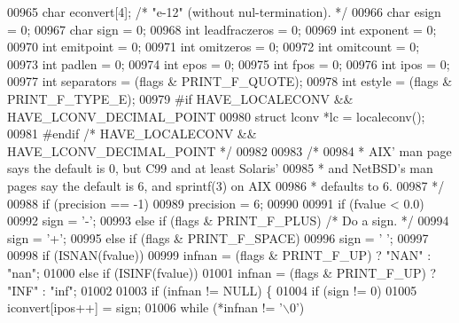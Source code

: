 \begin{DoxyCode}
{{{{{00965     \textcolor{keywordtype}{char} econvert[4];   \textcolor{comment}{/* "e-12" (without nul-termination). */}
00966     \textcolor{keywordtype}{char} esign = 0;
00967     \textcolor{keywordtype}{char} sign = 0;
00968     \textcolor{keywordtype}{int} leadfraczeros = 0;
00969     \textcolor{keywordtype}{int} exponent = 0;
00970     \textcolor{keywordtype}{int} emitpoint = 0;
00971     \textcolor{keywordtype}{int} omitzeros = 0;
00972     \textcolor{keywordtype}{int} omitcount = 0;
00973     \textcolor{keywordtype}{int} padlen = 0;
00974     \textcolor{keywordtype}{int} epos = 0;
00975     \textcolor{keywordtype}{int} fpos = 0;
00976     \textcolor{keywordtype}{int} ipos = 0;
00977     \textcolor{keywordtype}{int} separators = (flags & PRINT\_F\_QUOTE);
00978     \textcolor{keywordtype}{int} estyle = (flags & PRINT\_F\_TYPE\_E);
00979 \textcolor{preprocessor}{#if HAVE\_LOCALECONV && HAVE\_LCONV\_DECIMAL\_POINT}
00980     \textcolor{keyword}{struct }lconv *lc = localeconv();
00981 \textcolor{preprocessor}{#endif  }\textcolor{comment}{/* HAVE\_LOCALECONV && HAVE\_LCONV\_DECIMAL\_POINT */}\textcolor{preprocessor}{}
00982 
00983     \textcolor{comment}{/*}
00984 \textcolor{comment}{     * AIX' man page says the default is 0, but C99 and at least Solaris'}
00985 \textcolor{comment}{     * and NetBSD's man pages say the default is 6, and sprintf(3) on AIX}
00986 \textcolor{comment}{     * defaults to 6.}
00987 \textcolor{comment}{     */}
00988     \textcolor{keywordflow}{if} (precision == -1)
00989         precision = 6;
00990 
00991     \textcolor{keywordflow}{if} (fvalue < 0.0)
00992         sign = \textcolor{charliteral}{'-'};
00993     \textcolor{keywordflow}{else} \textcolor{keywordflow}{if} (flags & PRINT\_F\_PLUS)  \textcolor{comment}{/* Do a sign. */}
00994         sign = \textcolor{charliteral}{'+'};
00995     \textcolor{keywordflow}{else} \textcolor{keywordflow}{if} (flags & PRINT\_F\_SPACE)
00996         sign = \textcolor{charliteral}{' '};
00997 
00998     \textcolor{keywordflow}{if} (ISNAN(fvalue))
00999         infnan = (flags & PRINT\_F\_UP) ? \textcolor{stringliteral}{"NAN"} : \textcolor{stringliteral}{"nan"};
01000     \textcolor{keywordflow}{else} \textcolor{keywordflow}{if} (ISINF(fvalue))
01001         infnan = (flags & PRINT\_F\_UP) ? \textcolor{stringliteral}{"INF"} : \textcolor{stringliteral}{"inf"};
01002 
01003     \textcolor{keywordflow}{if} (infnan != NULL) \{
01004         \textcolor{keywordflow}{if} (sign != 0)
01005             iconvert[ipos++] = sign;
01006         \textcolor{keywordflow}{while} (*infnan != \textcolor{charliteral}{'\(\backslash\)0'})
}}}}}
\end{DoxyCode}
